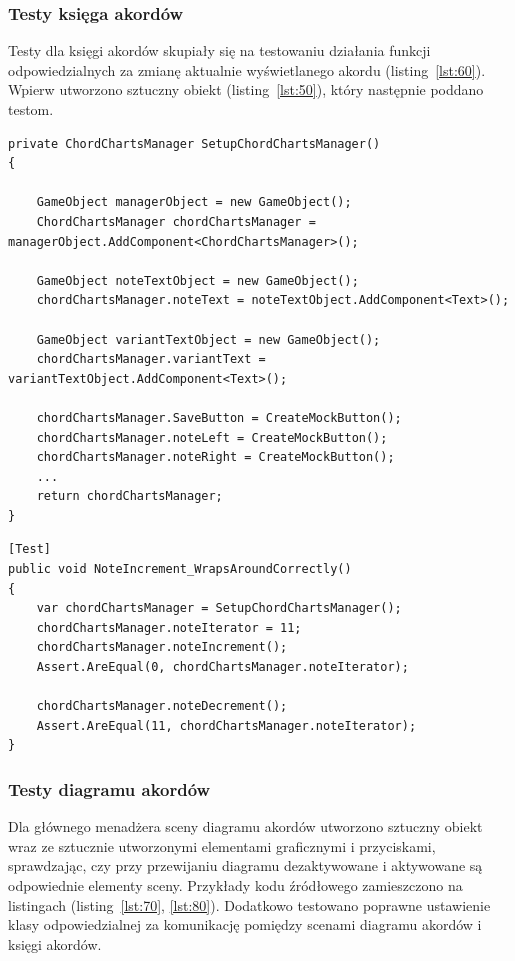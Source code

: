 \subsubsection{Testy księga akordów}

Testy dla księgi akordów skupiały się na testowaniu działania funkcji odpowiedzialnych za zmianę aktualnie wyświetlanego akordu (listing~\ref{lst:60}). Wpierw utworzono sztuczny obiekt (listing~\ref{lst:50}), który następnie poddano testom.

\begin{lstlisting}[style=sharpcstyle,caption=Funkcja \texttt{SetupChordChartsManager}, label=lst:50]
private ChordChartsManager SetupChordChartsManager()
{

    GameObject managerObject = new GameObject();
    ChordChartsManager chordChartsManager = managerObject.AddComponent<ChordChartsManager>();

    GameObject noteTextObject = new GameObject();
    chordChartsManager.noteText = noteTextObject.AddComponent<Text>();

    GameObject variantTextObject = new GameObject();
    chordChartsManager.variantText = variantTextObject.AddComponent<Text>();

    chordChartsManager.SaveButton = CreateMockButton();
    chordChartsManager.noteLeft = CreateMockButton();
    chordChartsManager.noteRight = CreateMockButton();
    ...
    return chordChartsManager;
}
\end{lstlisting}


\begin{lstlisting}[style=sharpcstyle,caption=Funkcja \texttt{NoteIncrement\_WrapsAroundCorrectly}, label=lst:60]
[Test]
public void NoteIncrement_WrapsAroundCorrectly()
{
    var chordChartsManager = SetupChordChartsManager();
    chordChartsManager.noteIterator = 11;
    chordChartsManager.noteIncrement();
    Assert.AreEqual(0, chordChartsManager.noteIterator);

    chordChartsManager.noteDecrement();
    Assert.AreEqual(11, chordChartsManager.noteIterator);
}
\end{lstlisting}

\subsubsection{Testy diagramu akordów}

Dla głównego menadżera sceny diagramu akordów utworzono sztuczny obiekt wraz ze sztucznie utworzonymi elementami graficznymi i przyciskami, sprawdzając, czy przy przewijaniu diagramu dezaktywowane i aktywowane są odpowiednie elementy sceny. Przykłady kodu źródłowego zamieszczono na listingach (listing~\ref{lst:70}, \ref{lst:80}). Dodatkowo testowano poprawne ustawienie klasy odpowiedzialnej za komunikację pomiędzy scenami diagramu akordów i księgi akordów.

